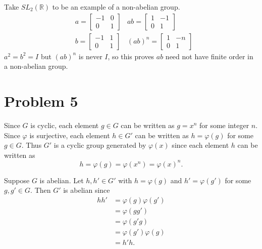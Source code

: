 \documentclass{article}
\begin{document}
Take $SL_2(\mathbb{R})$ to be an example of a non-abelian group.
\begin{align*}
	&a = \begin{bmatrix}
		-1 & 0 \\
		0 & 1
	\end{bmatrix} 
	&ab = 
	\begin{bmatrix}
		1 & -1 \\
		0 & 1 
	\end{bmatrix} \\
	&b = 
	\begin{bmatrix}
		-1 & 1 \\
		0 & 1
	\end{bmatrix} 
	&(ab)^n = 
	\begin{bmatrix}
		1 & -n \\
		0 & 1 
	\end{bmatrix}
\end{align*}
$a^2 = b^2 = I$ but $(ab)^n$ is never $I$,
so this proves $ab$ need not have finite order 
in a non-abelian group.

\section*{Problem 5}
Since $G$ is cyclic, each element $g \in G$ can be written 
as $g = x^n$ for some integer $n$.
Since $\varphi$ is surjective, each element $h \in G'$ 
can be written as $h = \varphi(g)$ for some $g \in G$.
Thus $G'$ is a cyclic group generated by $\varphi(x)$ since
each element $h$ can be written as
\[
	h = \varphi(g) = \varphi(x^n) = \varphi(x)^n.
\]

Suppose $G$ is abelian.
Let $h, h' \in G'$ with $h = \varphi(g)$ and $h' = \varphi(g')$
for some $g, g' \in G$.
Then $G'$ is abelian since
\begin{align*}
	hh' &= \varphi(g)\varphi(g') \\
	&= \varphi(gg') \\
	&= \varphi(g'g) \\
	&= \varphi(g')\varphi(g) \\
	&= h'h.
\end{align*}
\end{document}
